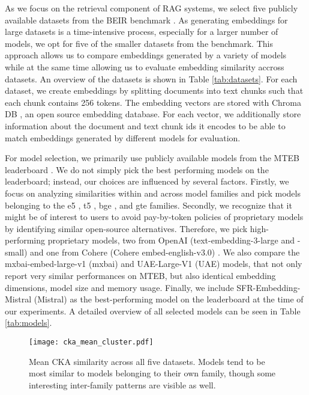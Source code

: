 \documentclass[nonacm,sigconf]{acmart}
\begin{document}
As we focus on the retrieval component of RAG systems, we select five publicly available datasets from the BEIR benchmark \cite{beir}. As generating embeddings for large datasets is a time-intensive process, especially for a larger number of models, we opt for five of the smaller datasets from the benchmark. This approach allows us to compare embeddings generated by a variety of models while at the same time allowing us to evaluate embedding similarity accross datasets. An overview of the datasets is shown in Table \ref{tab:datasets}. For each dataset, we create embeddings by splitting documents into text chunks such that each chunk contains 256 tokens. The embedding vectors are stored with Chroma DB \cite{chromadb}, an open source embedding database. For each vector, we additionally store information about the document and text chunk ids it encodes to be able to match embeddings generated by different models for evaluation.

For model selection, we primarily use publicly available models from the MTEB leaderboard \cite{mteb}. We do not simply pick the best performing models on the leaderboard; instead, our choices are influenced by several factors. Firstly, we focus on analyzing similarities within and across model families and pick models belonging to the e5 \cite{e5}, t5 \cite{sentencet5, gtrt5}, bge \cite{bge}, and gte \cite{gte} families. Secondly, we recognize that it might be of interest to users to avoid pay-by-token policies of proprietary models by identifying similar open-source alternatives. Therefore, we pick high-performing proprietary models, two from OpenAI (text-embedding-3-large and -small) \cite{openai} and one from Cohere (Cohere embed-english-v3.0) \cite{cohere}. We also compare the mxbai-embed-large-v1 (mxbai) \cite{mxbai} and UAE-Large-V1 (UAE) \cite{mxbaiuae} models, that not only report very similar performances on MTEB, but also identical embedding dimensions, model size and memory usage. Finally, we include SFR-Embedding-Mistral (Mistral) \cite{mistral} as the best-performing model on the leaderboard at the time of our experiments. A detailed overview of all selected models can be seen in Table \ref{tab:models}.

\begin{figure}[]
    \centering
    \texttt{[image: cka\_mean\_cluster.pdf]}
    \caption{Mean CKA similarity across all five datasets. Models tend to be most similar to models belonging to their own family, though some interesting inter-family patterns are visible as well.}
    \label{fig:cka}
\end{figure}
\end{document}
